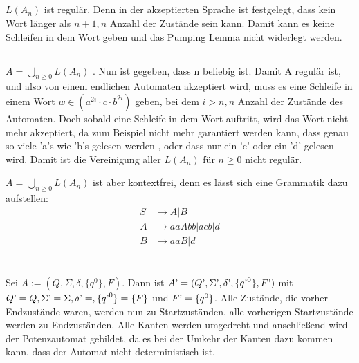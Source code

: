 \documentclass{article}
\begin{document}
\subsection{}

$L(A_n)$ ist regulär. Denn in der akzeptierten Sprache ist
festgelegt, dass kein Wort länger als $n + 1, n$ Anzahl der Zustände
sein kann. Damit kann es keine Schleifen in dem Wort geben und das
Pumping Lemma nicht widerlegt werden.

 \subsection{}
 
 $A = \bigcup_{n \geq 0} L(A_n)$ . Nun ist gegeben, dass n beliebig
ist. Damit A regulär ist, und also von einem endlichen Automaten
akzeptiert wird, muss es eine Schleife in einem Wort $w \in
(a^{2i}\cdot c\cdot b^{2i})$ geben, bei dem $i > n, n$ Anzahl der
Zustände des Automaten. Doch sobald eine Schleife in dem Wort auftritt, 
wird das Wort nicht mehr akzeptiert, da zum Beispiel nicht mehr garantiert werden kann, dass genau so viele 'a's wie 'b's gelesen werden , oder dass nur ein 'c' oder ein 'd' gelesen wird. Damit ist die Vereinigung aller $L(A_n)$ für $n \geq 0$ nicht regulär. 

 $A = \bigcup_{n \geq 0} L(A_n)$ ist aber kontextfrei, denn es lässt sich eine Grammatik dazu aufstellen:
\begin{align*}
 S &\rightarrow A | B \\
 A &\rightarrow aaAbb | acb | d \\
 B &\rightarrow aaB | d 
\end{align*}
 
\section{}
\subsection{}

Sei $A := (Q, \Sigma, \delta, \{q^0\}, F)$. 
Dann ist $ A\textrm' = (Q\textrm', \Sigma\textrm', 
\delta\textrm', \{q\textrm'^0\},F\textrm')
$ mit $ Q\textrm' = Q, \Sigma\textrm' = \Sigma, 
 \delta\textrm' = , \{q\textrm'^0\}= \{F\} $ und $  F\textrm' = \{q^0\} $.
Alle Zustände, die vorher Endzustände waren, werden nun zu Startzuständen, alle vorherigen Startzustände werden
zu Endzuständen. Alle Kanten werden umgedreht und anschließend wird der Potenzautomat gebildet, da es bei der
Umkehr der Kanten dazu kommen kann, dass der Automat nicht-deterministisch ist. 
  
\end{document}
